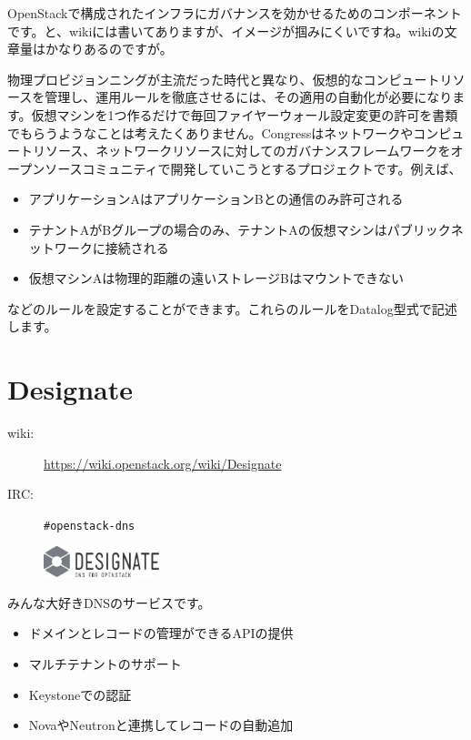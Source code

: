 OpenStackで構成されたインフラにガバナンスを効かせるためのコンポーネントです。と、wikiには書いてありますが、イメージが掴みにくいですね。wikiの文章量はかなりあるのですが。

物理プロビジョンニングが主流だった時代と異なり、仮想的なコンピュートリソースを管理し、運用ルールを徹底させるには、その適用の自動化が必要になります。仮想マシンを1つ作るだけで毎回ファイヤーウォール設定変更の許可を書類でもらうようなことは考えたくありません。Congressはネットワークやコンピュートリソース、ネットワークリソースに対してのガバナンスフレームワークをオープンソースコミュニティで開発していこうとするプロジェクトです。例えば、

\begin{itemize}
	\item アプリケーションAはアプリケーションBとの通信のみ許可される
	\item テナントAがBグループの場合のみ、テナントAの仮想マシンはパブリックネットワークに接続される
	\item 仮想マシンAは物理的距離の遠いストレージBはマウントできない
\end{itemize}

などのルールを設定することができます。これらのルールをDatalog型式で記述します。

\section{Designate}

\begin{description}
	\item[wiki:] \url{https://wiki.openstack.org/wiki/Designate}
	\item[IRC:] \verb|#openstack-dns|
\end{description}

\begin{figure}
	\vspace*{-2\intextsep}
	\begin{center}
		\includegraphics[width=0.3\textwidth]{img/logo-designate.pdf}
	\end{center}
\end{figure}

みんな大好きDNSのサービスです。

\begin{itemize}
	\item ドメインとレコードの管理ができるAPIの提供
	\item マルチテナントのサポート
	\item Keystoneでの認証
	\item NovaやNeutronと連携してレコードの自動追加
\end{itemize}

